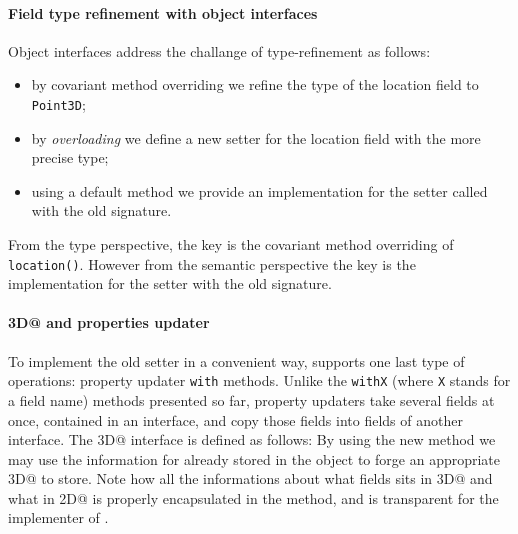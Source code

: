 \paragraph{Field type refinement with object interfaces}
Object interfaces address the challange of type-refinement as follows:
\begin{itemize}
\item by covariant method overriding we refine the type of the location field to \texttt{Point3D};
\item by \emph{overloading} we define a new setter for the location field with the more precise type;
\item using a default method we provide an implementation for the setter called 
with the old signature.
\end{itemize}




\noindent From the type perspective, the key is the covariant method
overriding of \texttt{location()}. However from the semantic
perspective the key is the implementation for the setter with the old
signature.

\paragraph{\Q@Point3D@ and properties updater}
To implement the old setter in a convenient way, \mixin supports one
last type of operations: property updater \texttt{with}
methods. Unlike the \texttt{withX} (where \texttt{X} stands for a
field name) methods presented so far, property updaters take several
fields at once, contained in an interface, and copy those fields into
fields of another interface.
The \Q@Point3D@ interface is defined as follows:
\noindent By using the new \Q@with@ method we may use the information for
\Q@z@ already stored in the object to forge an appropriate \Q@Point3D@
to store.  Note how all the informations about what fields sits in
\Q@Point3D@ and what in \Q@Point2D@ is properly encapsulated in the
\Q@with@ method, and is transparent for the implementer of \Q@Bird@.

